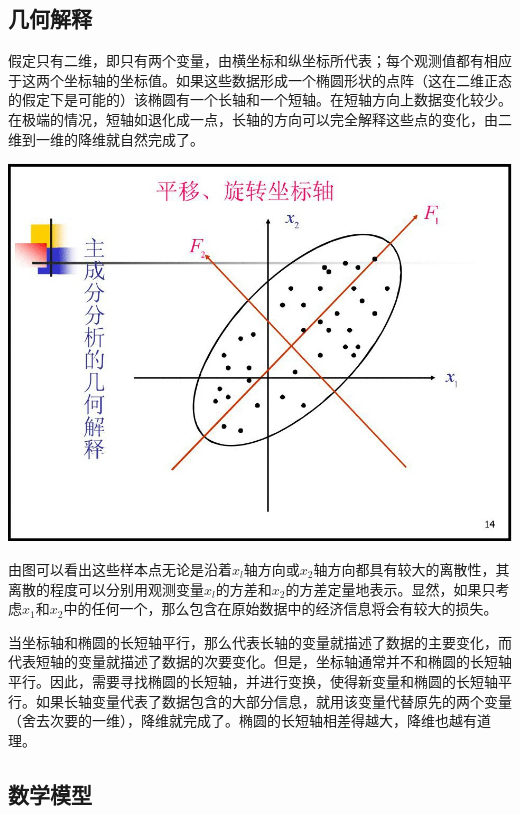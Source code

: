 \documentclass[]{ctexbook}
\begin{document}
\hypertarget{ux51e0ux4f55ux89e3ux91ca}{%
\subsection{几何解释}\label{ux51e0ux4f55ux89e3ux91ca}}

假定只有二维，即只有两个变量，由横坐标和纵坐标所代表；每个观测值都有相应于这两个坐标轴的坐标值。如果这些数据形成一个椭圆形状的点阵（这在二维正态的假定下是可能的）该椭圆有一个长轴和一个短轴。在短轴方向上数据变化较少。在极端的情况，短轴如退化成一点，长轴的方向可以完全解释这些点的变化，由二维到一维的降维就自然完成了。

\includegraphics[width=1\linewidth,height=0.5\textheight]{fig/pca}

由图可以看出这些样本点无论是沿着\(x_l\)轴方向或\(x_2\)轴方向都具有较大的离散性，其离散的程度可以分别用观测变量\(x_l\)的方差和\(x_2\)的方差定量地表示。显然，如果只考虑\(x_1\)和\(x_2\)中的任何一个，那么包含在原始数据中的经济信息将会有较大的损失。

当坐标轴和椭圆的长短轴平行，那么代表长轴的变量就描述了数据的主要变化，而代表短轴的变量就描述了数据的次要变化。但是，坐标轴通常并不和椭圆的长短轴平行。因此，需要寻找椭圆的长短轴，并进行变换，使得新变量和椭圆的长短轴平行。如果长轴变量代表了数据包含的大部分信息，就用该变量代替原先的两个变量（舍去次要的一维），降维就完成了。椭圆的长短轴相差得越大，降维也越有道理。

\hypertarget{ux6570ux5b66ux6a21ux578b}{%
\subsection{数学模型}\label{ux6570ux5b66ux6a21ux578b}}
\end{document}
